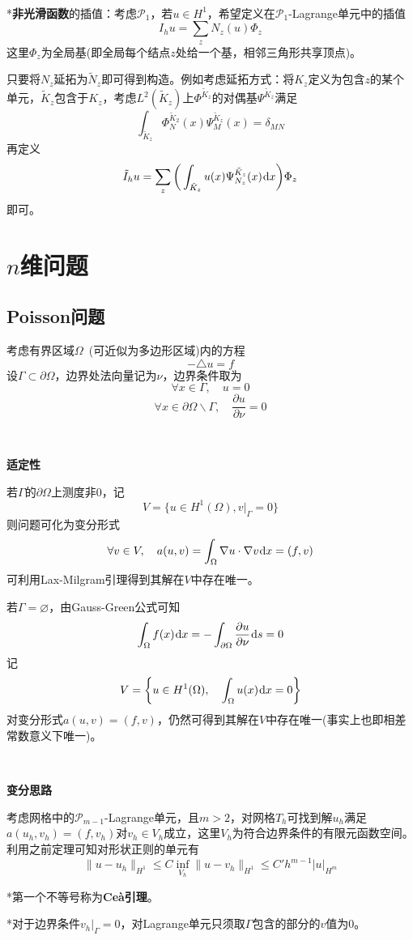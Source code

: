 \documentclass[a4paper,UTF8,fontset=windows]{ctexart}
\newcommand*{\dr}{\hspace{0.07em}\mathrm{d}}
\newcommand*{\cp}{\mathcal{P}}
\begin{document}
\

*\textbf{非光滑函数}的插值：考虑$\cp_1$，若$u\in H^1$，希望定义在$\cp_1$-Lagrange单元中的插值
$$I_hu=\sum_zN_z(u)\Phi_z$$
这里$\Phi_z$为全局基(即全局每个结点$z$处给一个基，相邻三角形共享顶点)。

只要将$N_z$延拓为$\tilde{N}_z$即可得到构造。例如考虑延拓方式：将$K_z$定义为包含$z$的某个单元，$\tilde{K}_z$包含于$K_z$，考虑$L^2(\tilde{K}_z)$上$\Phi^{\tilde{K}_z}$的对偶基$\Psi^{\tilde{K}_z}$满足
$$\int_{\tilde{K}_z}\Phi_N^{\tilde{K}_2}(x)\Psi_M^{\tilde{K}_z}(x)=\delta_{MN}$$
再定义
$$\tilde{I}_hu=\sum_z\bigg(\int_{\tilde{K}_z}u(x)\Psi_{N_z}^{\tilde{K}_z}(x)\dr x\bigg)\Phi_z$$
即可。

\section{$n$维问题}
\subsection{Poisson问题}
考虑有界区域$\Omega$\ (可近似为多边形区域)内的方程
$$-\triangle u=f$$
设$\Gamma\subset\partial\Omega$，边界处法向量记为$\nu$，边界条件取为
$$\forall x\in\Gamma,\quad u=0$$
$$\forall x\in\partial\Omega\backslash\Gamma,\quad\frac{\partial u}{\partial\nu}=0$$

\

\textbf{适定性}

若$\Gamma$的$\partial\Omega$上测度非0，记
$$V=\{u\in H^1(\Omega),v\big|_\Gamma=0\}$$
则问题可化为变分形式
$$\forall v\in V,\quad a(u,v)=\int_\Omega\nabla u\cdot\nabla v\dr x=(f,v)$$
可利用Lax-Milgram引理得到其解在$V$中存在唯一。

若$\Gamma=\varnothing$，由Gauss-Green公式可知
$$\int_\Omega f(x)\dr x=-\int_{\partial\Omega}\frac{\partial u}{\partial\nu}\dr s=0$$
记
$$V=\bigg\{u\in H^1(\Omega),\quad\int_\Omega u(x)\dr x=0\bigg\}$$
对变分形式$a(u,v)=(f,v)$，仍然可得到其解在$V$中存在唯一(事实上也即相差常数意义下唯一)。

\

\textbf{变分思路}

考虑网格中的$\cp_{m-1}$-Lagrange单元，且$m>2$，对网格$T_h$可找到解$u_h$满足$a(u_h,v_h)=(f,v_h)$对$v_h\in V_h$成立，这里$V_h$为符合边界条件的有限元函数空间。利用之前定理可知对形状正则的单元有
$$\|u-u_h\|_{H^1}\le C\inf_{V_h}\|u-v_h\|_{H^1}\le C'h^{m-1}|u|_{H^m}$$

*第一个不等号称为\textbf{Ce\`a引理}。

*对于边界条件$v_h\big|_\Gamma=0$，对Lagrange单元只须取$\Gamma$包含的部分的$v$值为0。
\end{document}

